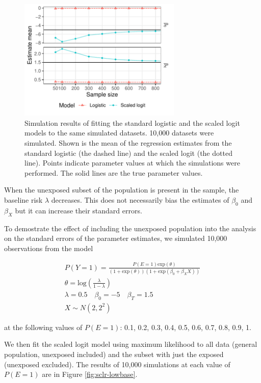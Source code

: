 \begin{figure}[htp]
	\centering
	\includegraphics[width=0.69\textwidth]{../logistic-plot/vary_nsam_mean.pdf}
	\caption{
		Simulation results of fitting the standard logistic and the scaled logit models to the same simulated datasets. 10,000 datasets were simulated. Shown is the mean of the regression estimates from the standard logistic (the dashed line) and the scaled logit (the dotted line). Points indicate parameter values at which the simulations were performed. The solid lines are the true parameter values.
	}
	\label{SclrMean}
\end{figure}

When the unexposed subset of the population is present in the sample, the baseline risk $\lambda$ decreases. This does not necessarily bias the estimates of $\beta_0$ and $\beta_X$ but it can increase their standard errors.

To demostrate the effect of including the unexposed population into the analysis on the standard errors of the parameter estimates, we simulated 10,000 observations from the model

\[
	\begin{gathered}
		P(Y=1) = \frac{P(E=1)\text{exp}(\theta)}{(1+\text{exp}(\theta))(1+\text{exp}(\beta_0+\beta_X X))} \\
		\theta = \text{log}(\frac{\lambda}{1-\lambda}) \\
		\lambda = 0.5 \quad \beta_0 = -5 \quad \beta_T = 1.5 \\
		X \sim N(2, 2^2)
	\end{gathered}
\]

at the following values of \(P(E=1)\): 0.1, 0.2, 0.3, 0.4, 0.5, 0.6, 0.7, 0.8, 0.9, 1.

We then fit the scaled logit model using maximum likelihood to all data (general population, unexposed included) and the subset with just the exposed (unexposed excluded). The results of 10,000 simulations at each value of \(P(E=1)\) are in Figure \ref{fig:sclr-lowbase}.

